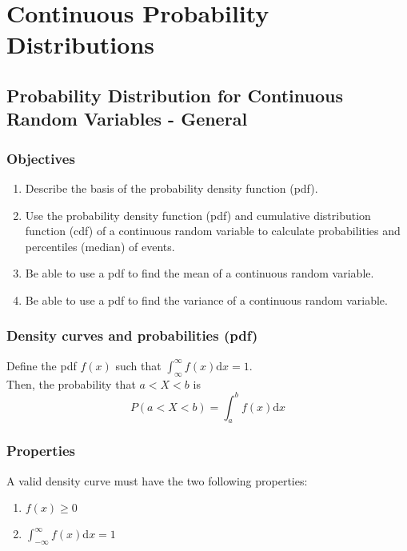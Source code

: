 \chapter{Continuous Probability Distributions}  %

\section{Probability Distribution for Continuous Random Variables - General}  %
    \subsection*{Objectives}
        \begin{enumerate}
            \item Describe the basis of the probability density function (pdf).
            \item Use the probability density function (pdf) and cumulative distribution function (cdf) of a continuous random variable to calculate probabilities and percentiles (median) of events.
            \item Be able to use a pdf to find the mean of a continuous random variable.
            \item Be able to use a pdf to find the variance of a continuous random variable.
        \end{enumerate}

    \subsection{Density curves and probabilities (pdf)}  %
        Define the pdf $f(x)$ such that $\int_\infty^\infty f(x)\mathrm{d}x=1$. \\
        Then, the probability that $a < X < b$ is
        \[P(a<X<b)=\int_a^bf(x)\mathrm{d}x\]

    \subsection{Properties}  %
        A valid density curve must have the two following properties:
        \begin{enumerate}
            \item $f(x)\geq 0$
            \item $\int_{-\infty}^\infty f(x)$d$x=1$
        \end{enumerate}
        \\

